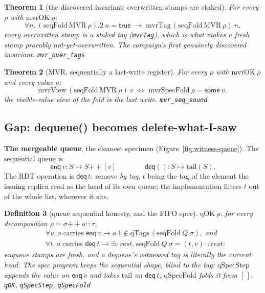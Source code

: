 \documentclass[11pt]{article}
\newtheorem{theorem}{Theorem}[section]
\newtheorem{definition}[theorem]{Definition}
\newcommand{\lean}[1]{\texttt{#1}}
\newcommand{\enq}{\mathsf{enq}}
\newcommand{\deq}{\mathsf{deq}}
\begin{document}
\begin{theorem}[the discovered invariant: overwritten stamps are
staked]
\label{thm:mvrovertags}
For every $\rho$ with $\mathrm{mvrOK}\ \rho$:
\[
  \forall n.\
  (\mathrm{seqFold}\ \mathrm{MVR}\ \rho).2\ n = \mathsf{true}
  \;\to\; \mathrm{mvrTag}\,(\mathrm{seqFold}\ \mathrm{MVR}\ \rho)\ n ,
\]
every overwritten stamp is a staked tag (\lean{mvrTag}), which is
what makes a fresh stamp provably not-yet-overwritten. The
campaign's first genuinely discovered invariant.
\hfill\lean{mvr\_over\_tags}
\end{theorem}

\begin{theorem}[MVR, sequentially a last-write register]
\label{thm:mvrseq}
For every $\rho$ with $\mathrm{mvrOK}\ \rho$ and every value $v$:
\[
  \mathrm{mvrView}\,(\mathrm{seqFold}\ \mathrm{MVR}\ \rho)\ v
  \;\iff\; \mathrm{mvrSpecFold}\ \rho = \mathsf{some}\ v ,
\]
the visible-value view of the fold is the last write.
\hfill\lean{mvr\_seq\_sound}
\end{theorem}

\subsection{Gap: dequeue() becomes delete-what-I-saw}
\label{sec:queue}

\textbf{The mergeable queue}, the cleanest specimen
(Figure~\ref{fig:witness-queue}). The sequential queue is
\[
  \enq\,v : S \mapsto S \mathbin{+\!\!+} [v]
  \qquad\qquad
  \deq() : S \mapsto \mathrm{tail}(S).
\]
The RDT operation is $\deq\,t$: remove \emph{by tag}, $t$ being the
tag of the element the issuing replica read as the head of its own
queue; the implementation filters $t$ out of the whole list, wherever
it sits.

\begin{definition}[queue sequential honesty, and the FIFO spec]
\label{def:qok}
$\mathrm{qOK}\ \rho$: for every decomposition
$\rho = \sigma \mathbin{+\!\!+} o :: \tau$,
\[
\begin{aligned}
  &\forall v.\ o \text{ carries } \enq\,v \to
    o.1 \notin \mathrm{qTags}\,(\mathrm{seqFold}\ Q\ \sigma) ,
    \textit{ and} \\
  &\forall t.\ o \text{ carries } \deq\,t \to
    \exists v\ \mathit{rest}.\
    \mathrm{seqFold}\ Q\ \sigma = (t, v) :: \mathit{rest} :
\end{aligned}
\]
enqueue stamps are fresh, and a dequeue's witnessed tag is
\emph{literally the current head}. The spec program keeps the
sequential shape, blind to the tag: $\mathrm{qSpecStep}$ appends the
value on $\enq\,v$ and takes $\mathrm{tail}$ on $\deq\,t$;
$\mathrm{qSpecFold}$ folds it from $[\,]$.
\hfill\lean{qOK}, \lean{qSpecStep}, \lean{qSpecFold}
\end{definition}
\end{document}
